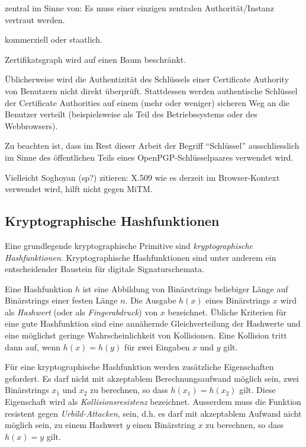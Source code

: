 zentral im Sinne von: Es muss einer einzigen zentralen
Authorit\"at/Instanz vertraut werden.

kommerziell oder staatlich.

Zertifikatsgraph wird auf einen Baum beschr\"ankt.

\"Ublicherweise wird die Authentizit\"at des Schl\"ussels einer
Certificate Authority von Benutzern nicht direkt
\"uberpr\"uft. Stattdessen werden authentische Schl\"ussel der
Certificate Authorities auf einem (mehr oder weniger) sicheren Weg an
die Benutzer verteilt (beispielsweise als Teil des Betriebssystems oder
des Webbrowsers).

Zu beachten ist, dass im Rest dieser Arbeit der Begriff
``Schl\"ussel'' ausschliesslich im Sinne des \"offentlichen Teils
eines OpenPGP-Schl\"usselpaares verwendet wird.

Vielleicht Soghoyan (sp?) zitieren: X.509 wie es derzeit im
Browser-Kontext verwendet wird, hilft nicht gegen MiTM.

\subsection{Kryptographische Hashfunktionen}
\label{sec:krypt-hashf}

Eine grundlegende kryptographische Primitive sind
\emph{kryptographische Hashfunktionen}. Kryptographische
Hashfunktionen sind unter anderem ein entscheidender Baustein f\"ur
digitale Signaturschemata.

Eine Hashfunktion $h$ ist eine Abbildung von Bin\"arstrings beliebiger
L\"ange auf Bin\"arstrings einer festen L\"ange $n$. Die Ausgabe
$h(x)$ eines Bin\"arstrings $x$ wird als \emph{Hashwert} (oder als
\emph{Fingerabdruck}) von $x$ bezeichnet. \"Ubliche Kriterien f\"ur
eine gute Hashfunktion sind eine ann\"ahernde Gleichverteilung der
Hashwerte und eine m\"oglichst geringe Wahrscheinlichkeit von
Kollisionen. Eine Kollision tritt dann auf, wenn $h(x) = h(y)$ f\"ur
zwei Eingaben $x$ und $y$ gilt.

F\"ur eine kryptographische Hashfunktion werden zus\"atzliche
Eigenschaften gefordert. Es darf nicht mit akzeptablem
Berechnungsaufwand m\"oglich sein, zwei Bin\"arstrings $x_1$ und $x_2$
zu berechnen, so dass $h(x_1) = h(x_2)$ gilt. Diese Eigenschaft wird
als \emph{Kollisionsresistenz} bezeichnet. Ausserdem muss die Funktion
resistent gegen \emph{Urbild-Attacken}, sein, d.h. es darf mit
akzeptablem Aufwand nicht m\"oglich sein, zu einem Hashwert $y$ einen
Bin\"arstring $x$ zu berechnen, so dass $h(x) = y$ gilt.

